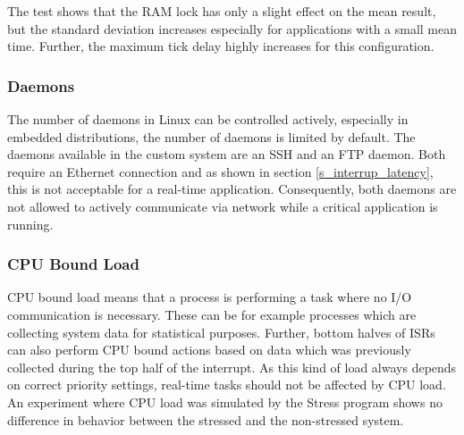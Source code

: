 The test shows that the \ac{RAM} lock has only a slight effect on the mean result, but the standard deviation increases especially for applications with a small mean time. 
Further, the maximum tick delay highly increases for this configuration.

\subsubsection{Daemons}
The number of daemons in Linux can be controlled actively, especially in embedded distributions, the number of daemons is limited by default.
The daemons available in the custom system are an \ac{SSH} and an \ac{FTP} daemon.
Both require an Ethernet connection and as shown in section \ref{s_interrup_latency}, this is not acceptable for a real-time application.
Consequently, both daemons are not allowed to actively communicate via network while a critical application is running.

\subsubsection{CPU Bound Load}
\ac{CPU} bound load means that a process is performing a task where no \ac{I/O} communication is necessary.
These can be for example processes which are collecting system data for statistical purposes. 
Further, bottom halves of \acp{ISR} can also perform \ac{CPU} bound actions based on data which was previously collected during the top half of the interrupt.
As this kind of load always depends on correct priority settings, real-time tasks should not be affected by \ac{CPU} load. 
An experiment where \ac{CPU} load was simulated by the Stress program shows no difference in behavior between the stressed and the non-stressed system.

